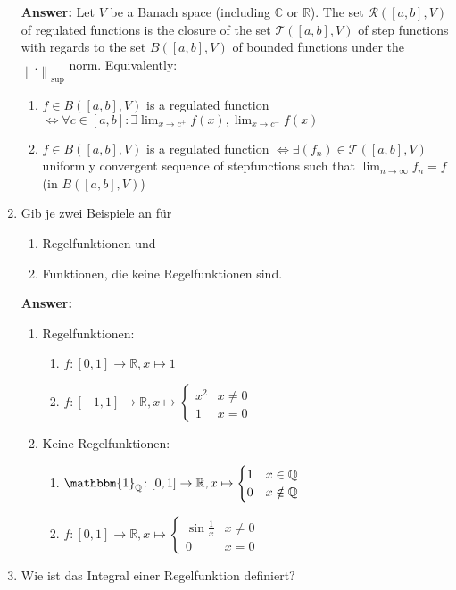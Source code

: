 \documentclass[11pt]{article}
\newcommand{\norm}[1]{\left\lVert#1\right\rVert}
\newcommand{\RR}[0]{\mathbb{R}}
\newcommand{\CC}[0]{\mathbb{C}}
\newcommand{\QQ}[0]{\mathbb{Q}}
\begin{document}
\begin{enumerate}
    \textbf{Answer:}
    Let $V$ be a Banach space (including $\CC$ or $\RR$). The set $\mathcal{R}([a, b], V)$ of regulated functions is the closure of the set $\mathcal{T}([a, b], V)$ of step functions with regards to the set $B([a, b], V)$ of bounded functions under the $\norm{.}_{\sup}$ norm. Equivalently: \begin{enumerate}
    \item $f \in B([a, b], V)$ is a regulated function $\Leftrightarrow \forall c \in [a, b]\colon \exists \lim_{x\to c^+} f(x), \lim_{x\to c^-} f(x)$
    \item $f \in B([a, b], V)$ is a regulated function $\Leftrightarrow \exists (f_n) \in \mathcal{T}([a, b], V)$ uniformly convergent sequence of stepfunctions such that $\lim_{n \to \infty} f_n = f$ (in $B([a, b], V)$)
    \end{enumerate}

    \item Gib je zwei Beispiele an für
    \begin{enumerate}
        \item Regelfunktionen und
        \item Funktionen, die keine Regelfunktionen sind.
    \end{enumerate}

    \textbf{Answer:}
    \begin{enumerate}
        \item Regelfunktionen:\begin{enumerate}
            \item $f: [0, 1] \to \mathbb{R}, x \mapsto 1$
            \item $f: [-1, 1] \to \mathbb{R}, x \mapsto \begin{cases}
                x^2&x\neq0\\
                1&x=0
            \end{cases}$
        \end{enumerate}

        \item Keine Regelfunktionen:\begin{enumerate}
            \item $\mathbbm{1}_\QQ\colon [0, 1] \to \RR, x \mapsto \begin{cases}
                1&x\in\QQ\\
                0&x\notin\QQ
            \end{cases}$
            \item $f\colon [0, 1]\to \RR, x \mapsto \begin{cases}
                \sin{\frac{1}{x}}&x\neq 0\\
                0&x = 0
            \end{cases}$
        \end{enumerate}
    \end{enumerate}
    \item Wie ist das Integral einer Regelfunktion definiert?


\end{enumerate}
\end{document}
